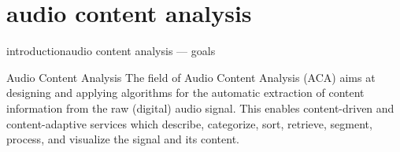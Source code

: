     \section[aca]{audio content analysis}
        \begin{frame}{introduction}{audio content analysis --- goals}
            \begin{block}{Audio Content Analysis}
                The field of Audio Content Analysis (ACA) aims at designing and applying algorithms for the automatic extraction of content information from the raw (digital) audio signal. This enables content-driven and content-adaptive services which describe, categorize, sort, retrieve, segment, process, and visualize the signal and its content.                
            \end{block}
        \end{frame}
        
